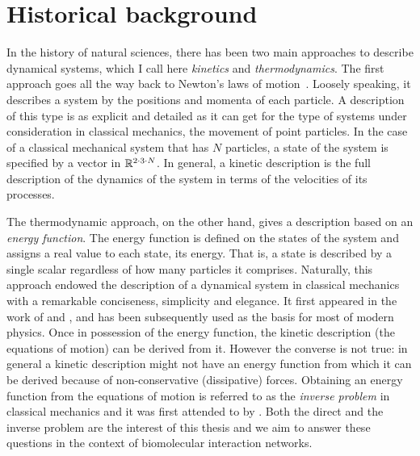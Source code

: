 % 
\section{Historical background}

In the history of natural sciences,
there has been two main approaches to describe dynamical systems,
which I call here
\emph{kinetics} and \emph{thermodynamics}.
The first approach goes all the way back to
Newton's laws of motion~\citep{newton}.
Loosely speaking, it describes a system by
the positions and momenta of each particle.
A description of this type is as explicit and detailed as it can get
for the type of systems under consideration in classical mechanics,
\ie the movement of point particles.
In the case of a classical mechanical system that has $N$ particles,
a state of the system is specified by
a vector in $\mathbb{R}^{2 \cdot 3 \cdot N}$.
In general, a kinetic description is the full description of the
dynamics of the system in terms of the velocities of its processes.

The thermodynamic approach, on the other hand,
gives a description based on an \emph{energy function}.
The energy function is defined on the states of the system
and assigns a real value to each state, its energy.
That is, a state is described by a single scalar
regardless of how many particles it comprises.
Naturally, this approach endowed the description of
a dynamical system in classical mechanics
with a remarkable conciseness, simplicity and elegance.
It first appeared in the work of
\citet{lagrange2} and \citet{hamilton},
and has been subsequently used as the basis for most of modern physics.
Once in possession of the energy function,
the kinetic description (\ie the equations of motion)
can be derived from it.
However the converse is not true:
in general a kinetic description might not have an energy function
from which it can be derived \citep{santilli}
because of non-conservative (dissipative) forces.
Obtaining an energy function from the equations of motion
is referred to as the \emph{inverse problem} in classical mechanics
and it was first attended to by \citet{helmholtz}.
Both the direct and the inverse problem are the interest of this thesis
and we aim to answer these questions
in the context of biomolecular interaction networks.


